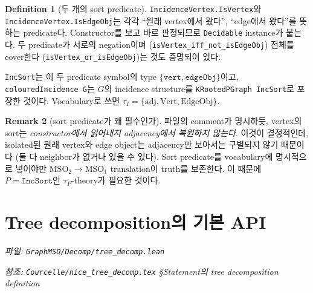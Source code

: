 \documentclass[11pt]{article}
\theoremstyle{definition}
\newtheorem{definition}{Definition}[section]
\newtheorem{remark}[definition]{Remark}
\theoremstyle{plain}
\newcommand{\MSOtwo}{\mathrm{MSO}_2}
\newcommand{\MSOone}{\mathrm{MSO}_1}
\newcommand{\lean}[1]{\texttt{#1}}
\newcommand{\leanfile}[1]{\texttt{#1}}
\begin{document}
\begin{definition}[두 개의 sort predicate]
\label{basics:def:incsort}
\lean{IncidenceVertex.IsVertex}와 \lean{IncidenceVertex.IsEdgeObj}는 각각
``원래 vertex에서 왔다'', ``edge에서 왔다''를 뜻하는 predicate다. Constructor를
보고 바로 판정되므로 \lean{Decidable} instance가 붙는다. 두 predicate가 서로의
negation이며 (\lean{isVertex\_iff\_not\_isEdgeObj}) 전체를 cover한다
(\lean{isVertex\_or\_isEdgeObj})는 것도 증명되어 있다.

\lean{IncSort}는 이 두 predicate symbol의 type
$\{\lean{vert}, \lean{edgeObj}\}$이고, \lean{colouredIncidence G}는 $G$의
incidence structure를 \lean{KRootedPGraph IncSort}로 포장한 것이다.
Vocabulary로 쓰면
$\tau_I = \{\mathrm{adj}, \mathrm{Vert}, \mathrm{EdgeObj}\}$.
\end{definition}

\begin{remark}[sort predicate가 왜 필수인가]
\label{basics:rem:whysorts}
파일의 comment가 명시하듯, vertex의 sort는 \emph{constructor에서 읽어내지
adjacency에서 복원하지 않는다}. 이것이 결정적인데, isolated된 원래 vertex와
edge object는 adjacency만 보아서는 구별되지 않기 때문이다 (둘 다 neighbor가
없거나 있을 수 있다). Sort predicate를 vocabulary에 명시적으로 넣어야만
$\MSOtwo \to \MSOone$ translation이 truth를 보존한다. 이 때문에
$P = \lean{IncSort}$인 $\tau_P$-theory가 필요한 것이다.
\end{remark}

\section{Tree decomposition의 기본 API}
\label{basics:sec:treedecomp}

\emph{파일: \leanfile{GraphMSO/Decomp/tree\_decomp.lean}}

\emph{참조: \leanfile{Courcelle/nice\_tree\_decomp.tex} \S Statement의
tree decomposition definition}
\end{document}

